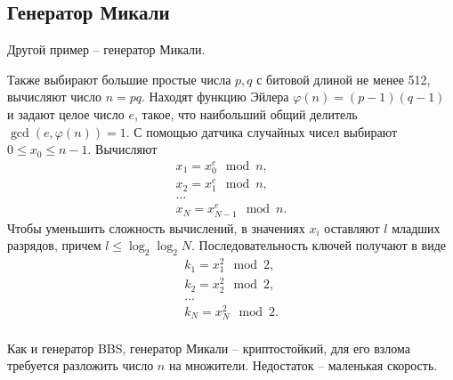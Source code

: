 \subsection{Генератор Микали}

Другой пример -- генератор Микали.

Также выбирают большие простые числа $p,q$ с битовой длиной не менее 512, вычисляют число $n = pq$. Находят функцию Эйлера $\varphi(n) = (p-1) (q-1)$ и задают целое число $e$, такое, что наибольший общий делитель $\gcd(e, \varphi(n)) = 1$. С помощью датчика случайных чисел выбирают $0 \leq x_{0} \leq n-1$. Вычисляют
\[ \begin{array}{l}
    x_1 = x_0^e \mod n, \\
    x_2 = x_1^e \mod n, \\
    \dots \\
    x_N = x_{N-1}^e \mod n.
\end{array} \]
Чтобы уменьшить сложность вычислений, в значениях $x_i$ оставляют $l$ младших разрядов, причем $l \leq \log_2 \log_2 N$. Последовательность ключей получают в виде
\[ \begin{array}{l}
    k_1 = x_1^2 \mod 2, \\
    k_2 = x_2^2 \mod 2, \\
    \dots \\
    k_N = x_N^2 \mod 2. \\
\end{array} \]

Как и генератор BBS, генератор Микали -- криптостойкий, для его взлома требуется разложить число $n$ на множители. Недостаток -- маленькая скорость.
